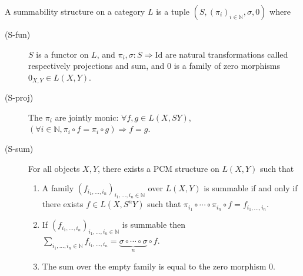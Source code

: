 \begin{originaldef}[37] A summability structure on a category $L$ is a tuple $(S,(\pi_i)_{i\in\mathbb N},\sigma,0)$ where
\begin{description}
\item[(S-fun)] $S$ is a functor on $L$, and $\pi_i,\sigma:S\Rightarrow\mathrm{Id}$ are natural transformations called respectively projections and sum, and $0$ is a family of zero morphisms $0_{X,Y}\in L(X,Y)$.
\item[(S-proj)] The $\pi_i$ are jointly monic: $\forall f,g\in L(X,SY)$, $(\forall i\in\mathbb N,\pi_i\circ f=\pi_i\circ g)\Rightarrow f=g$.
\item[(S-sum)] For all objects $X,Y$, there exists a PCM structure on $L(X,Y)$ such that
\begin{enumerate}\item[(S-sum-1)] A family $(f_{i_1,\ldots,i_n})_{i_1,\ldots,i_n\in\mathbb N}$ over $L(X,Y)$ is summable if and only if there exists $f\in L(X,S^nY)$ such that $\pi_{i_1}\circ\cdots\circ\pi_{i_n}\circ f=f_{i_1,\ldots,i_n}$.
\item[(S-sum-2)] If $(f_{i_1,\ldots,i_n})_{i_1,\ldots,i_n\in\mathbb N}$ is summable then $\sum_{i_1,\ldots,i_n\in\mathbb N}f_{i_1,\ldots,i_n}=\underbrace{\sigma\circ\cdots\circ\sigma}_{n}\circ f$.
\item[(S-sum-3)] The sum over the empty family is equal to the zero morphism $0$.
\end{enumerate}\end{description}\end{originaldef}

